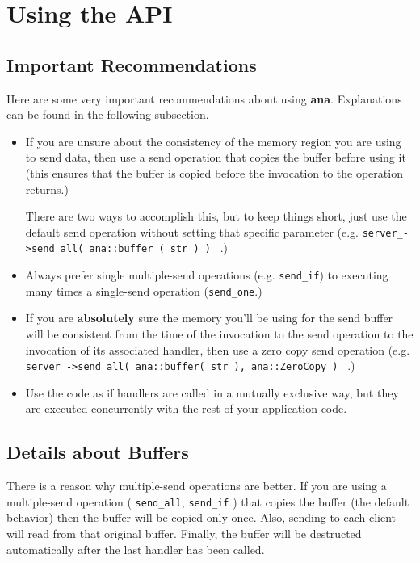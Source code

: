 \documentclass[a4paper,12pt,english]{article}
\newcommand{\ana}{\textbf{ana}}
\begin{document}
\section{Using the API}

\subsection{Important Recommendations}

Here   are   some   very   important   recommendations   about   using
\ana. Explanations can be found in the following subsection.

\begin{itemize}
   \item If you are unsure about the consistency of the memory region
     you are using to send data, then use a send operation that copies
     the buffer before using it (this ensures that the buffer is
     copied before the invocation to the operation returns.)
     
     There are two ways to  accomplish this, but to keep things short,
     just use the default send operation without setting that specific
     parameter (e.g. \texttt{server\_->send\_all(  ana::buffer ( str )
       ) } .)
   \item   Always  prefer   single   multiple-send  operations   (e.g.
     \texttt{send\_if})   to  executing   many  times   a  single-send
     operation (\texttt{send\_one}.)
   \item  If you  are \textbf{absolutely}  sure the  memory  you'll be
     using for the send buffer will be consistent from the time of the
     invocation  to  the  send  operation  to the  invocation  of  its
     associated  handler,   then  use  a  zero   copy  send  operation
     (e.g.    \texttt{server\_->send\_all(    ana::buffer(   str    ),
       ana::ZeroCopy ) } .)
   \item  Use  the  code as  if  handlers  are  called in  a  mutually
     exclusive way,  but they are executed concurrently  with the rest
     of your application code.
\end{itemize}

\subsection{Details about Buffers}

There is a reason why  multiple-send operations are better. If you are
using     a    multiple-send    operation     (    \texttt{send\_all},
\texttt{send\_if} ) that copies the buffer (the default behavior) then
the buffer will be copied only once. Also, sending to each client will
read from that original buffer. Finally, the buffer will be destructed
automatically after the last handler has been called.
\end{document}
